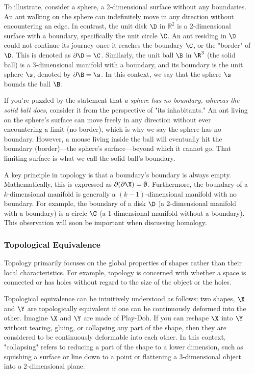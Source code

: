 To illustrate, consider a sphere, a 2-dimensional surface without any boundaries. An ant walking on the sphere can indefinitely move in any direction without encountering an edge. In contrast, the unit disk $\D$ in $\mathbb{R}^2$ is a 2-dimensional surface with a boundary, specifically the unit circle $\C$.  An ant residing in $\D$ could not continue its journey once it reaches the boundary $\C$, or the "border" of $\D$. This is denoted as $\partial \D = \C$. Similarly, the unit ball $\B$ in $\R^3$   (the solid ball) is a 3-dimensional manifold with a boundary, and its boundary is the unit sphere $\s$, denoted by $\partial \B = \s$. In this context, we say that the sphere $\s$ bounds the ball $\B$.

If you're puzzled by the statement that \textit{ a sphere has no boundary, whereas the solid ball does}, consider it from the perspective of "its inhabitants." An ant living on the sphere's surface can move freely in any direction without ever encountering a limit (no border), which is why we say the sphere has no boundary. However, a mouse living inside the ball will eventually hit the boundary (border)—the sphere's surface—beyond which it cannot go. That limiting surface is what we call the solid ball's boundary. 

A key principle in topology is that a boundary's boundary is always empty. Mathematically, this is expressed as $\partial (\partial \X) = \emptyset$. Furthermore, the boundary of a $k$-dimensional manifold is generally a $(k-1)$-dimensional manifold with no boundary. For example, the boundary of a disk $\D$ (a 2-dimensional manifold with a boundary) is a circle $\C$ (a 1-dimensional manifold without a boundary). This observation will soon be important when discussing homology. 


\subsubsection{Topological Equivalence} Topology primarily focuses on the global properties of shapes rather than their local characteristics. For example, topology is concerned with whether a space is connected or has holes without regard to the size of the object or the holes. 

Topological equivalence can be intuitively understood as follows: two shapes, $\X$ and $\Y$ are topologically equivalent if one can be continuously deformed into the other. Imagine $\X$ and $\Y$ are made of Play-Doh. If you can reshape $\X$ into $\Y$ without tearing, gluing, or collapsing any part of the shape, then they are considered to be continuously deformable into each other.  In this context, "collapsing" refers to reducing a part of the shape to a lower dimension, such as squishing a surface or line down to a point or flattening a 3-dimensional object into a 2-dimensional plane.

